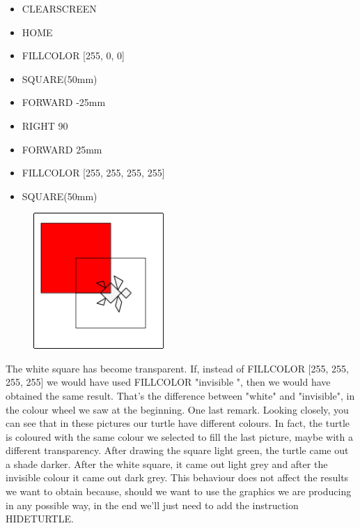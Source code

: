 \vskip 1cm

\begin{scriptsize}
\begin{minipage}{0.40\textwidth}
\begin{itemize}[itemsep=-3pt,parsep=2pt]
\item[] CLEARSCREEN
\item[] HOME
\item[] FILLCOLOR [255, 0, 0]                                
\item[] SQUARE(50mm)
\item[] FORWARD -25mm
\item[] RIGHT 90                                             
\item[] FORWARD 25mm
\item[] FILLCOLOR [255, 255, 255, 255]
\item[] SQUARE(50mm)                                        
\end{itemize}
\end{minipage}
\end{scriptsize}
\begin{minipage}{0.4\textwidth}
\begin{figure}[H]
   \includegraphics[width=5.0cm,trim=4 4 8 4,clip]{./images/disegnare/disegnare-19.png}
   \label{dis-18}
\end{figure}
\end{minipage} \hfill

\vskip 1cm

The white square has become transparent. If, instead of FILLCOLOR [255, 255, 255, 255] we would have used FILLCOLOR  "invisible ", then we would have obtained the same result. That's the difference between "white" and "invisible", in the colour wheel we saw at the beginning.
One last remark. Looking closely, you can see that in these pictures our turtle have different colours. In fact, the turtle is coloured with the same colour we selected to fill the last picture, maybe with a different transparency. After drawing the square light green, the turtle came out a shade darker. After the white square, it came out light grey and after the invisible colour it came out dark grey. This behaviour does not affect the results we want to obtain because, should we want to use the graphics we are producing in any possible way, in the end we'll just need to add the instruction HIDETURTLE.

